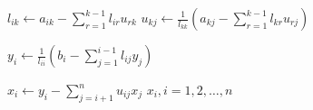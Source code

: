 \documentclass[varwidth]{standalone}
\begin{document}
\begin{algorithmic}[1]
        \State $l_{ik} \gets a_{ik} - \displaystyle\sum_{r=1}^{k-1}l_{ir}u_{rk}$
    \EndFor
        \State $u_{kj} \gets \displaystyle\frac{1}{l_{kk}}\left( a_{kj} - \sum_{r=1}^{k-1}l_{kr}u_{rj} \right)$
    \EndFor
\EndFor

    \State $y_i \gets \displaystyle \frac{1}{l_{ii}}\left(b_i - \sum_{j=1}^{i-1}l_{ij}y_j\right)$
\EndFor

    \State $x_i \gets \displaystyle y_i - \sum_{j=i+1}^n u_{ij}x_j$
\EndFor
\State \Return $x_i, i = 1, 2, \ldots, n$

\EndFunction
\end{algorithmic}
\end{document}
